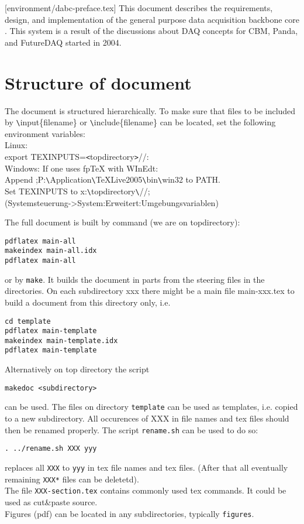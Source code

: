 [environment/dabc-preface.tex]
This document describes the requirements, design, and implementation of the
general purpose data acquisition backbone core \dabc.
This system is a result of the discussions about DAQ concepts for CBM,
Panda, and FutureDAQ started in 2004.

\section{Structure of document}
The document is structured hierarchically. To make sure that files
to be included by \verb+\+input\{filename\} or \verb+\+include\{filename\}
can be located, set the following environment variables:\\
Linux:\\
export TEXINPUTS=\verb+<+topdirectory\verb+>+//:\\
Windows: If one uses fpTeX with WInEdt:\\
Append ;P:\verb+\+Application\verb+\+TeXLive2005\verb+\+bin\verb+\+win32 to PATH.\\
Set TEXINPUTS to x:\verb+\+topdirectory\verb+\+//;\\
(Systemsteuerung->System:Erweitert:Umgebungsvariablen)

The full document is built by command (we are on topdirectory):
\begin{verbatim}
pdflatex main-all
makeindex main-all.idx
pdflatex main-all
\end{verbatim}
or by {\tt make}. It builds the document in parts from the steering files in the directories.
On each subdirectory xxx there might be a main file main-xxx.tex to build a document 
from this directory only, i.e.
\begin{verbatim}
cd template
pdflatex main-template
makeindex main-template.idx
pdflatex main-template
\end{verbatim}
Alternatively on top directory the script 
\begin{verbatim}
makedoc <subdirectory>
\end{verbatim}
can be used. 
The files on directory {\tt template} can be used as templates, i.e. copied to a new subdirectory.
All occurences of XXX in file names and tex files should then be renamed properly.
The script {\tt rename.sh} can be used to do so:
\begin{verbatim}
. ../rename.sh XXX yyy
\end{verbatim}
replaces all {\tt XXX} to {\tt yyy} in tex file names and tex files.
(After that all eventually remaining {\tt *XXX*} files can be deletetd).\\
The file {\tt XXX-section.tex} contains commonly used tex commands.
It could be used as cut\&paste source.\\
Figures (pdf) can be located in any subdirectories, typically {\tt figures}.\\

